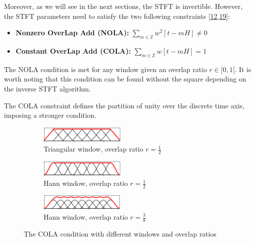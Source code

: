 \documentclass[american,]{article}
\providecommand{\tightlist}{%
  \setlength{\itemsep}{0pt}\setlength{\parskip}{0pt}}
\theoremstyle{definition}
\theoremstyle{definition}
\theoremstyle{definition}
\theoremstyle{remark}
\begin{document}
Moreover, as we will see in the next sections, the STFT is invertible.
However, the STFT parameters need to satisfy the two following constraints {[}\protect\hyperlink{ref-griffin1983}{12},\protect\hyperlink{ref-muller2015}{19}{]}:

\begin{itemize}
\tightlist
\item
  \textbf{Nonzero OverLap Add (NOLA):} \(\sum\limits_{m\in\mathbb{Z}} w^2[t-mH] \neq 0\)
\item
  \textbf{Constant OverLap Add (COLA):} \(\sum\limits_{m\in\mathbb{Z}} w[t-mH] = 1\)
\end{itemize}

The NOLA condition is met for any window given an overlap ratio \(r\in[0,1[\).
It is worth noting that this condition can be found without the square
depending on the inverse STFT algorithm.

The COLA constraint defines the partition of unity over the discrete time axis,
imposing a stronger condition.

\begin{figure}[H]
    \centering
    \begin{subfigure}[t]{\textwidth}
        \centering
        \includegraphics[width=0.45\textwidth]{img/woa_triangular_1_2.png}
        \caption{Triangular window, overlap ratio $r=\frac{1}{2}$}
    \end{subfigure}
    \begin{subfigure}[t]{\textwidth}
        \centering
        \includegraphics[width=0.45\textwidth]{img/woa_hann_1_2.png}
        \caption{Hann window, overlap ratio $r=\frac{1}{2}$}
    \end{subfigure}
    \begin{subfigure}[t]{\textwidth}
        \centering
        \includegraphics[width=0.45\textwidth]{img/woa_hann_3_8.png}
        \caption{Hann window, overlap ratio $r=\frac{3}{8}$}
    \end{subfigure}
    \caption{The COLA condition with different windows and overlap ratios}
\end{figure}
\end{document}

